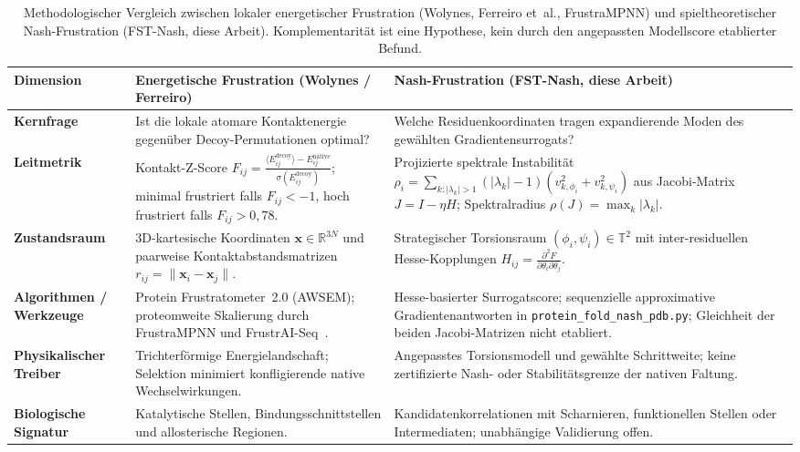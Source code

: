 \documentclass[12pt,a4paper]{article}
\theoremstyle{remark}
\begin{document}
\begin{table}[htbp]
\centering
\caption{Methodologischer Vergleich zwischen lokaler energetischer Frustration (Wolynes, Ferreiro et~al., FrustraMPNN) und spieltheoretischer Nash-Frustration (FST-Nash, diese Arbeit). Komplementarität ist eine Hypothese, kein durch den angepassten Modellscore etablierter Befund.}
\label{tab:frustration-comparison}
\small
\begin{tabularx}{\textwidth}{@{}L{0.20\textwidth} L{0.37\textwidth} Y@{}}
\toprule
\textbf{Dimension} & \textbf{Energetische Frustration (Wolynes / Ferreiro)} & \textbf{Nash-Frustration (FST-Nash, diese Arbeit)} \\
\midrule
\textbf{Kernfrage} & Ist die lokale atomare Kontaktenergie gegenüber Decoy-Permutationen optimal? & Welche Residuenkoordinaten tragen expandierende Moden des gewählten Gradientensurrogats? \\
\addlinespace
\textbf{Leitmetrik} & Kontakt-Z-Score $F_{ij} = \frac{\langle E_{ij}^{\text{decoy}} \rangle - E_{ij}^{\text{native}}}{\sigma(E_{ij}^{\text{decoy}})}$; minimal frustriert falls $F_{ij} < -1$, hoch frustriert falls $F_{ij} > 0{,}78$. & Projizierte spektrale Instabilität $\rho_i = \sum_{k: |\lambda_k|>1} (|\lambda_k|-1)(v_{k,\phi_i}^2 + v_{k,\psi_i}^2)$ aus Jacobi-Matrix $J = I - \eta H$; Spektralradius $\rho(J) = \max_k |\lambda_k|$. \\
\addlinespace
\textbf{Zustandsraum} & 3D-kartesische Koordinaten $\mathbf{x} \in \mathbb{R}^{3N}$ und paarweise Kontaktabstandsmatrizen $r_{ij} = \|\mathbf{x}_i - \mathbf{x}_j\|$. & Strategischer Torsionsraum $(\phi_i, \psi_i) \in \mathbb{T}^2$ mit inter-residuellen Hesse-Kopplungen $H_{ij} = \frac{\partial^2 F}{\partial \theta_i \partial \theta_j}$. \\
\addlinespace
\textbf{Algorithmen / Werkzeuge} & Protein Frustratometer~2.0 (AWSEM); proteomweite Skalierung durch FrustraMPNN und FrustrAI-Seq~\citep{Beining2026,Leusch2026}. & Hesse-basierter Surrogatscore; sequenzielle approximative Gradientenantworten in \texttt{protein\_fold\_nash\_pdb.py}; Gleichheit der beiden Jacobi-Matrizen nicht etabliert. \\
\addlinespace
\textbf{Physikalischer Treiber} & Trichterförmige Energielandschaft; Selektion minimiert konfligierende native Wechselwirkungen. & Angepasstes Torsionsmodell und gewählte Schrittweite; keine zertifizierte Nash- oder Stabilitätsgrenze der nativen Faltung. \\
\addlinespace
\textbf{Biologische Signatur} & Katalytische Stellen, Bindungsschnittstellen und allosterische Regionen. & Kandidatenkorrelationen mit Scharnieren, funktionellen Stellen oder Intermediaten; unabhängige Validierung offen. \\

\end{tabularx}
\end{table}
\end{document}
